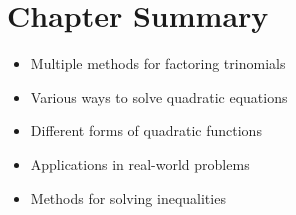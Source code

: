 \documentclass[12pt]{article}
\begin{document}
\section*{Chapter Summary}
\begin{tcolorbox}[colback=lightgray,colframe=primary,title=Key Takeaways]
    \begin{itemize}
        \item Multiple methods for factoring trinomials
        \item Various ways to solve quadratic equations
        \item Different forms of quadratic functions
        \item Applications in real-world problems
        \item Methods for solving inequalities
    \end{itemize}
\end{tcolorbox}
\end{document}
